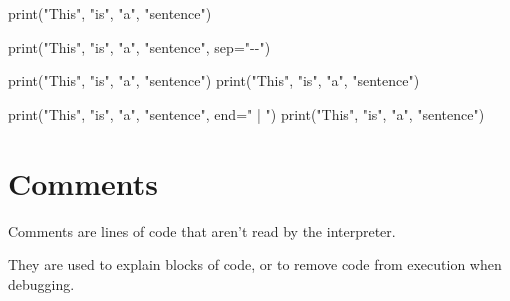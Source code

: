 \documentclass[
  letterpaper,
  DIV=11,
  numbers=noendperiod]{scrreprt}
\newenvironment{Shaded}{\begin{snugshade}}{\end{snugshade}}
\newcommand{\BuiltInTok}[1]{\textcolor[rgb]{0.00,0.23,0.31}{#1}}
\newcommand{\NormalTok}[1]{\textcolor[rgb]{0.00,0.23,0.31}{#1}}
\newcommand{\OperatorTok}[1]{\textcolor[rgb]{0.37,0.37,0.37}{#1}}
\newcommand{\StringTok}[1]{\textcolor[rgb]{0.13,0.47,0.30}{#1}}
\begin{document}
\begin{Shaded}
\begin{Highlighting}[]
\BuiltInTok{print}\NormalTok{(}\StringTok{"This"}\NormalTok{, }\StringTok{"is"}\NormalTok{, }\StringTok{"a"}\NormalTok{, }\StringTok{"sentence"}\NormalTok{)}
\end{Highlighting}
\end{Shaded}

\begin{Shaded}
\begin{Highlighting}[]
\BuiltInTok{print}\NormalTok{(}\StringTok{"This"}\NormalTok{, }\StringTok{"is"}\NormalTok{, }\StringTok{"a"}\NormalTok{, }\StringTok{"sentence"}\NormalTok{, sep}\OperatorTok{=}\StringTok{"{-}{-}"}\NormalTok{)}
\end{Highlighting}
\end{Shaded}

\begin{Shaded}
\begin{Highlighting}[]
\BuiltInTok{print}\NormalTok{(}\StringTok{"This"}\NormalTok{, }\StringTok{"is"}\NormalTok{, }\StringTok{"a"}\NormalTok{, }\StringTok{"sentence"}\NormalTok{)}
\BuiltInTok{print}\NormalTok{(}\StringTok{"This"}\NormalTok{, }\StringTok{"is"}\NormalTok{, }\StringTok{"a"}\NormalTok{, }\StringTok{"sentence"}\NormalTok{)}
\end{Highlighting}
\end{Shaded}

\begin{Shaded}
\begin{Highlighting}[]
\BuiltInTok{print}\NormalTok{(}\StringTok{"This"}\NormalTok{, }\StringTok{"is"}\NormalTok{, }\StringTok{"a"}\NormalTok{, }\StringTok{"sentence"}\NormalTok{, end}\OperatorTok{=}\StringTok{" | "}\NormalTok{)}
\BuiltInTok{print}\NormalTok{(}\StringTok{"This"}\NormalTok{, }\StringTok{"is"}\NormalTok{, }\StringTok{"a"}\NormalTok{, }\StringTok{"sentence"}\NormalTok{)}
\end{Highlighting}
\end{Shaded}

\hypertarget{comments}{%
\chapter{Comments}\label{comments}}

Comments are lines of code that aren't read by the interpreter.

They are used to explain blocks of code, or to remove code from
execution when debugging.
\end{document}
